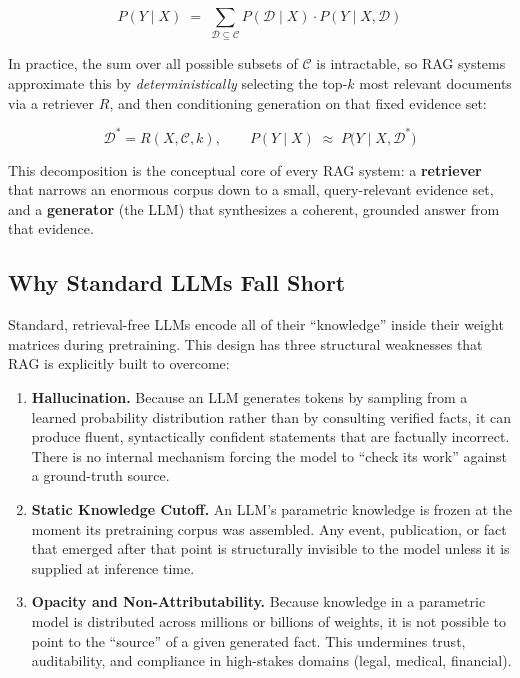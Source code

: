\documentclass[11pt,a4paper]{article}
\begin{document}
\begin{equation}
P(Y \mid X) \;=\; \sum_{\mathcal{D} \subseteq \mathcal{C}} P(\mathcal{D} \mid X) \cdot P(Y \mid X, \mathcal{D})
\end{equation}

In practice, the sum over all possible subsets of $\mathcal{C}$ is intractable, so RAG systems approximate this by \emph{deterministically} selecting the top-$k$ most relevant documents via a retriever $R$, and then conditioning generation on that fixed evidence set:

\begin{equation}
\mathcal{D}^{*} = R(X, \mathcal{C}, k), \qquad
P(Y \mid X) \;\approx\; P\big(Y \mid X, \mathcal{D}^{*}\big)
\end{equation}

This decomposition is the conceptual core of every RAG system: a \textbf{retriever} that narrows an enormous corpus down to a small, query-relevant evidence set, and a \textbf{generator} (the LLM) that synthesizes a coherent, grounded answer from that evidence.

\subsection{Why Standard LLMs Fall Short}

Standard, retrieval-free LLMs encode all of their ``knowledge'' inside their weight matrices during pretraining. This design has three structural weaknesses that RAG is explicitly built to overcome:

\begin{enumerate}[label=\textbf{(\alph*)}]
  \item \textbf{Hallucination.} Because an LLM generates tokens by sampling from a learned probability distribution rather than by consulting verified facts, it can produce fluent, syntactically confident statements that are factually incorrect. There is no internal mechanism forcing the model to ``check its work'' against a ground-truth source.
  \item \textbf{Static Knowledge Cutoff.} An LLM's parametric knowledge is frozen at the moment its pretraining corpus was assembled. Any event, publication, or fact that emerged after that point is structurally invisible to the model unless it is supplied at inference time.
  \item \textbf{Opacity and Non-Attributability.} Because knowledge in a parametric model is distributed across millions or billions of weights, it is not possible to point to the ``source'' of a given generated fact. This undermines trust, auditability, and compliance in high-stakes domains (legal, medical, financial).
\end{enumerate}
\end{document}

